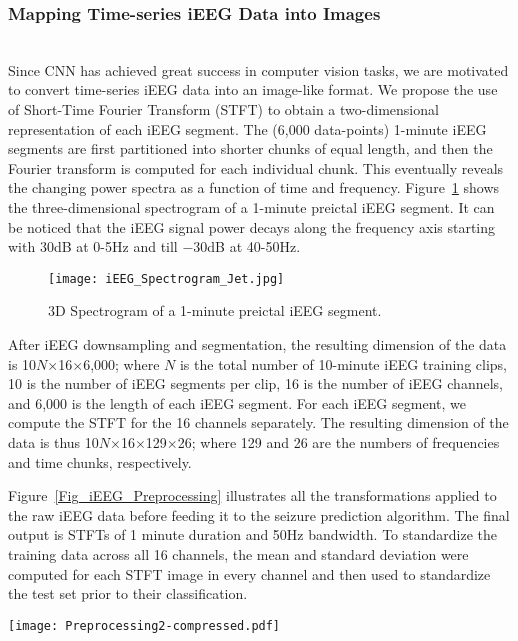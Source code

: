 \documentclass[journal]{IEEEtran}
\begin{document}
\subsubsection{Mapping Time-series iEEG Data into Images} ~\\
Since CNN has achieved great success in computer vision tasks, we are motivated to convert time-series iEEG data into an image-like format. We propose the use of Short-Time Fourier Transform (STFT) to obtain a two-dimensional representation of each iEEG segment. The (6,000 data-points) 1-minute iEEG segments are first partitioned into shorter chunks of equal length, and then the Fourier transform is computed for each individual chunk. This eventually reveals the changing power spectra as a function of time and frequency. Figure~\ref{Fig_Spectrogram_Jet} shows the three-dimensional spectrogram of a 1-minute preictal iEEG segment. It can be noticed that the iEEG signal power decays along the frequency axis starting with 30dB at 0-5Hz and till $-$30dB at 40-50Hz.       

\begin{figure}[!t]\centering
	\texttt{[image: iEEG\_Spectrogram\_Jet.jpg]}
	\caption{3D Spectrogram of a 1-minute preictal iEEG segment.}
	\label{Fig_Spectrogram_Jet}
\end{figure}

After iEEG downsampling and segmentation, the resulting dimension of the data is 10$N$$\times$16$\times$6,000; where $N$ is the total number of 10-minute iEEG training clips, 10 is the number of iEEG segments per clip, 16 is the number of iEEG channels, and 6,000 is the length of each iEEG segment. For each iEEG segment, we compute the STFT for the 16 channels separately. The resulting dimension of the data is thus 10$N$$\times$16$\times$129$\times$26; where 129 and 26 are the numbers of frequencies and time chunks, respectively.

Figure~\ref{Fig_iEEG_Preprocessing} illustrates all the transformations applied to the raw iEEG data before feeding it to the seizure prediction algorithm. The final output is STFTs of 1 minute duration and 50Hz bandwidth. To standardize the training data across all 16 channels, the mean and standard deviation were computed for each STFT image in every channel and then used to standardize the test set prior to their classification. 

\begin{figure*}[!ht]
	\centering
	\texttt{[image: Preprocessing2-compressed.pdf]}
	\caption{Schematic pipeline of the proposed iEEG data pre-processing approach for epileptic seizure prediction: SEG1, SEG2, $\cdots$, SEG10 are corresponding to the $1^{st}$, $2^{nd}$, and $10^{th}$ iEEG segments of each iEEG channel signal; $N_{Ch}$ is the total number of iEEG channels ($N_{Ch}$=16), $L$ is the number of segments per iEEG clip ($L$=10), and $d$ is the number of data-points in each iEEG segment ($d$=6,000).}
	\label{Fig_iEEG_Preprocessing}
\end{figure*}
\end{document}
